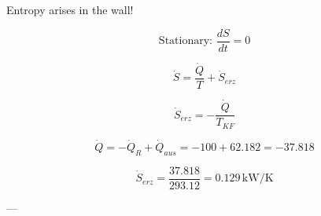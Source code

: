 Entropy arises in the wall!  

\[ \text{Stationary: } \frac{dS}{dt} = 0 \]  

\[ \dot{S} = \frac{\dot{Q}}{T} + \dot{S}_{erz} \]  

\[ \dot{S}_{erz} = -\frac{\dot{Q}}{T_{KF}} \]  

\[ \dot{Q} = -\dot{Q}_R + \dot{Q}_{aus} = -100 + 62.182 = -37.818 \]  

\[ \dot{S}_{erz} = \frac{37.818}{293.12} = 0.129 \, \text{kW/K} \]  

---